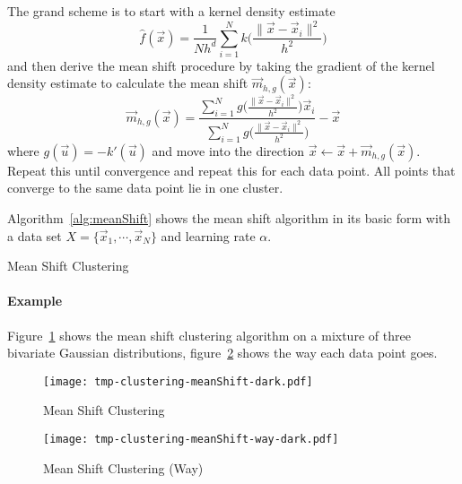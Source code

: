 		The grand scheme is to start with a kernel density estimate
		\begin{equation}
			\hat{f}(\vec{x}) = \frac{1}{Nh^d} \sum_{i = 1}^{N} k\Bigg( \frac{\lVert \vec{x} - \vec{x}_i \rVert^2}{h^2} \Bigg)
		\end{equation}
		and then derive the mean shift procedure by taking the gradient of the kernel density estimate to calculate the mean shift \( \vec{m}_{h, g}(\vec{x}) \):
		\begin{equation}
			\vec{m}_{h, g}(\vec{x}) = \frac{\sum_{i = 1}^{N} g\Big( \frac{\lVert \vec{x} - \vec{x}_i \rVert^2}{h^2} \Big) \vec{x}_i}{\sum_{i = 1}^{N} g\Big( \frac{\lVert \vec{x} - \vec{x}_i \rVert^2}{h^2} \Big)} - \vec{x}
		\end{equation}
		where \( g(\vec{u}) = -k'(\vec{u}) \) and move into the direction \( \vec{x} \gets \vec{x} + \vec{m}_{h, g}(\vec{x}) \). Repeat this until convergence and repeat this for each data point. All points that converge to the same data point lie in one cluster.

		Algorithm~\ref{alg:meanShift} shows the mean shift algorithm in its basic form with a data set \( X = \{ \vec{x}_1, \cdots, \vec{x}_N \} \) and learning rate \(\alpha\).

		\begin{algorithm}

			\caption{Mean Shift Clustering}
			\label{alg:meanShift}
		\end{algorithm}

		\paragraph{Example} 
			Figure~\ref{fig:meanShiftExample} shows the mean shift clustering algorithm on a mixture of three bivariate Gaussian distributions, figure~\ref{fig:meanShiftExampleWay} shows the way each data point goes.

			\begin{figure}
				\centering
				\texttt{[image: tmp-clustering-meanShift-dark.pdf]}
				\caption{Mean Shift Clustering}
				\label{fig:meanShiftExample}
			\end{figure}
			\begin{figure}
				\centering
				\texttt{[image: tmp-clustering-meanShift-way-dark.pdf]}
				\caption{Mean Shift Clustering (Way)}
				\label{fig:meanShiftExampleWay}
			\end{figure}
	
